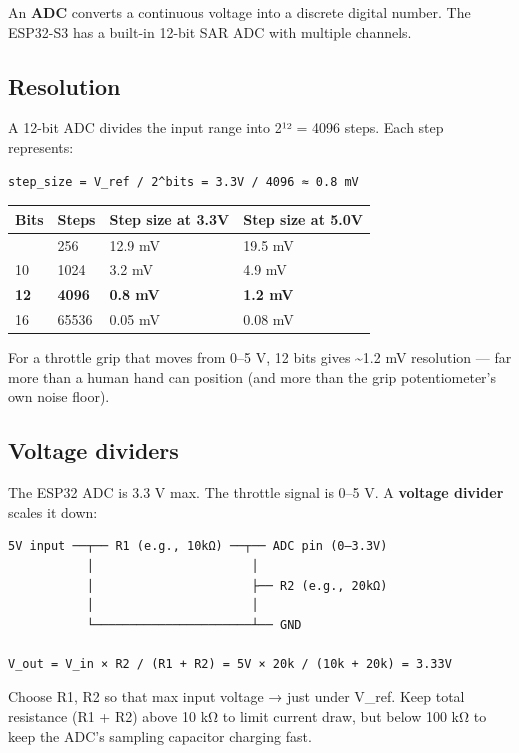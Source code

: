 \documentclass[12pt,a4paper,oneside]{report}
\begin{document}
An \textbf{ADC} converts a continuous voltage into a discrete digital number.
The ESP32-S3 has a built-in 12-bit SAR ADC with multiple channels.

\subsection{Resolution}\label{resolution}

A 12-bit ADC divides the input range into 2¹² = 4096 steps. Each step
represents:

\begin{verbatim}
step_size = V_ref / 2^bits = 3.3V / 4096 ≈ 0.8 mV
\end{verbatim}

\begin{longtable}[]{@{}llll@{}}
\toprule\noalign{}
Bits & Steps & Step size at 3.3V & Step size at 5.0V \\
\midrule\noalign{}
\endhead
\bottomrule\noalign{}
\endlastfoot
8 & 256 & 12.9 mV & 19.5 mV \\
10 & 1024 & 3.2 mV & 4.9 mV \\
\textbf{12} & \textbf{4096} & \textbf{0.8 mV} & \textbf{1.2 mV} \\
16 & 65536 & 0.05 mV & 0.08 mV \\
\end{longtable}

For a throttle grip that moves from 0--5 V, 12 bits gives \textasciitilde1.2 mV
resolution --- far more than a human hand can position (and more than the grip
potentiometer's own noise floor).

\subsection{Voltage dividers}\label{voltage-dividers}

The ESP32 ADC is 3.3 V max. The throttle signal is 0--5 V. A \textbf{voltage
divider} scales it down:

\begin{verbatim}
5V input ──┬── R1 (e.g., 10kΩ) ──┬── ADC pin (0–3.3V)
           │                      │
           │                      ├── R2 (e.g., 20kΩ)
           │                      │
           └──────────────────────┴── GND

V_out = V_in × R2 / (R1 + R2) = 5V × 20k / (10k + 20k) = 3.33V
\end{verbatim}

Choose R1, R2 so that max input voltage → just under V\_ref. Keep total
resistance (R1 + R2) above 10 kΩ to limit current draw, but below 100 kΩ to keep
the ADC's sampling capacitor charging fast.
\end{document}
